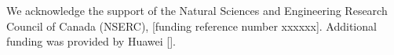 \begin{acks}
 We acknowledge the support of the Natural Sciences and Engineering Research Council of Canada (NSERC), [funding reference number xxxxxx]. Additional funding was provided by Huawei []. 
\end{acks}

